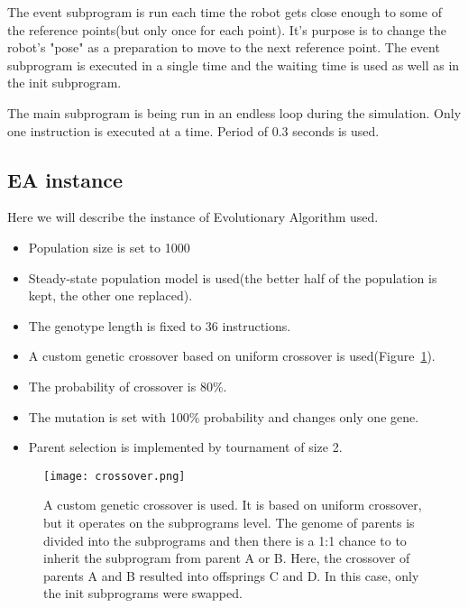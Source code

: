 \documentclass{ExcelAtFIT}
\begin{document}
The event subprogram is run each time the robot gets close enough to some of the reference points(but only once for each point).
It's purpose is to change the robot's "pose" as a preparation to move to the next reference point.
The event subprogram is executed in a single time and the waiting time is used as well as in the init subprogram.

The main subprogram is being run in an endless loop during the simulation.
Only one instruction is executed at a time.
Period of 0.3 seconds is used.

\subsection{EA instance}
\label{sec:Experiment}
Here we will describe the instance of Evolutionary Algorithm used.
\begin{itemize}
	\item Population size is set to 1000
	\item Steady-state population model is used(the better half of the population is kept, the other one replaced).
	\item The genotype length is fixed to 36 instructions.
	\item A custom genetic crossover based on uniform crossover is used(Figure~\ref{fig:Crossover}).
	\item The probability of crossover is 80\%.
	\item The mutation is set with 100\% probability and changes only one gene.
	\item Parent selection is implemented by tournament of size 2.
\end{itemize}

\begin{figure}[t]
	\centering
	{\texttt{[image: crossover.png]}}
	\caption{
	A custom genetic crossover is used.
	It is based on uniform crossover, but it operates on the subprograms level.
	The genome of parents is divided into the subprograms and then there is a 1:1 chance to to inherit the subprogram from parent A or B.
	Here, the crossover of parents A and B resulted into offsprings C and D.
	In this case, only the init subprograms were swapped.
	}
	\label{fig:Crossover}
\end{figure}
\end{document}
